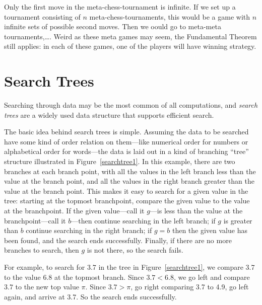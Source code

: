 \begin{definition}
\begin{optional}
Only the first move in the meta-chess-tournament is infinite.  If we
set up a tournament consisting of $n$ meta-chess-tournaments, this
would be a game with $n$ infinite sets of possible second moves.  Then
we oould go to meta-meta tournaments,\dots.  Weird as these meta games
may seem, the Fundamental Theorem still applies: in each of these
games, one of the players will have winning strategy.
\end{optional}

\begin{problems}
\practiceproblems
{}

\homeworkproblems
{}
\end{problems}

\section{Search Trees}\label{search_tree}

Searching through data may be the most common of all computations, and
\emph{search trees} are a widely used data structure that supports
efficient search.

The basic idea behind search trees is simple.  Assuming the data to be
searched have some kind of order relation on them---like numerical order
for numbers or alphabetical order for words---the data is laid out in
a kind of branching ``tree'' structure illustrated in
Figure~\ref{searchtree1}.  In this example, there are two branches at
each branch point, with all the values in the left branch less than
the value at the branch point, and all the values in the right branch
greater than the value at the branch point.  This makes it easy to
search for a given value in the tree: starting at the topmost
branchpoint, compare the given value to the value at the branchpoint.
If the given value---call it $g$---is less than the value at the
branchpoint---call it $b$---then continue searching in the left
branch; if $g$ is greater than $b$ continue searching in the right
branch; if $g = b$ then the given value has been found, and the search
ends successfully.  Finally, if there are no more branches to search,
then $g$ is not there, so the search fails.

For example, to search for 3.7 in the tree in Figure~\ref{searchtree1},
we compare 3.7 to the value 6.8 at the topmost branch.  Since $3.7 <
6.8$, we go left and compare $3.7$ to the new top value $\pi$.  Since
$3.7 > \pi$, go right comparing 3.7 to 4.9, go left again, and arrive
at 3.7. So the search ends successfully.


\end{definition}
